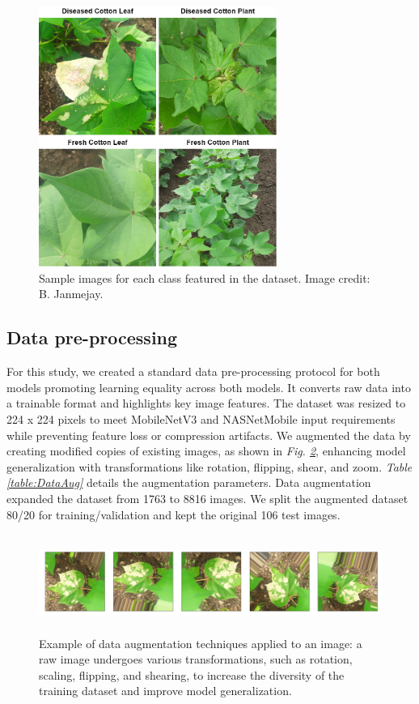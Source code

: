 \documentclass[conference]{IEEEtran}
\begin{document}
\begin{figure}[h]
\centerline{\includegraphics[height=8.5cm, width=.9\linewidth]{Images/cotton images.drawio.png}}
\caption{Sample images for each class featured in the dataset. Image credit: B. Janmejay.}
\label{CottonImages}
\end{figure}

\subsection{Data pre-processing}

For this study, we created a standard data pre-processing protocol for both models promoting learning equality across both models. It converts raw data into a trainable format and highlights key image features. The dataset was resized to 224 x 224 pixels to meet MobileNetV3 and NASNetMobile input requirements while preventing feature loss or compression artifacts. We augmented the data by creating modified copies of existing images, as shown in \emph{Fig. \ref{Augment}}, enhancing model generalization with transformations like rotation, flipping, shear, and zoom. \emph{Table \ref{table:DataAug}} details the augmentation parameters. Data augmentation expanded the dataset from 1763 to 8816 images. We split the augmented dataset 80/20 for training/validation and kept the original 106 test images.
 
\begin{figure}[ht]
\centering
\includegraphics[height=3.2cm, width=1\linewidth]{Images/Data_Augmentation5.png}
\caption{Example of data augmentation techniques applied to an image: a raw image undergoes various transformations, such as rotation, scaling, flipping, and shearing, to increase the diversity of the training dataset and improve model generalization.}
\label{Augment}
\end{figure}
\end{document}
